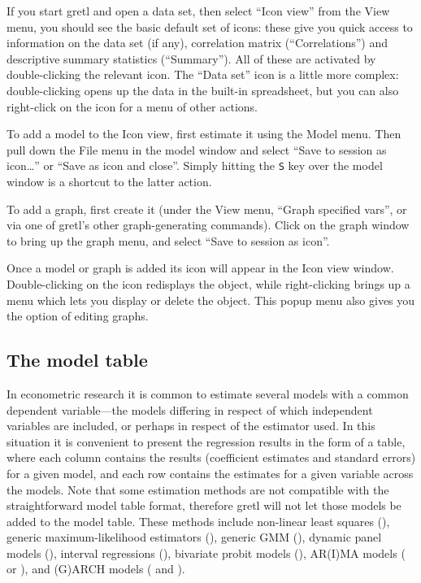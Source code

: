 If you start gretl and open a data set, then select ``Icon
view'' from the View menu, you should see the basic default set of
icons: these give you quick access to information on the data set (if
any), correlation matrix (``Correlations'') and descriptive summary
statistics (``Summary''). All of these are activated by
double-clicking the relevant icon.  The ``Data set'' icon is a little
more complex: double-clicking opens up the data in the built-in
spreadsheet, but you can also right-click on the icon for a menu of
other actions.

To add a model to the Icon view, first estimate it using the Model
menu.  Then pull down the File menu in the model window and select
``Save to session as icon\dots{}'' or ``Save as icon and close''.
Simply hitting the \verb+S+ key over the model window is a shortcut to
the latter action.

To add a graph, first create it (under the View menu, ``Graph
specified vars'', or via one of gretl's other graph-generating
commands).  Click on the graph window to bring up the graph menu, and
select ``Save to session as icon''.

Once a model or graph is added its icon will appear in the Icon view
window.  Double-clicking on the icon redisplays the object, while
right-clicking brings up a menu which lets you display or delete the
object.  This popup menu also gives you the option of editing graphs.

\subsection{The model table}
\label{model-table}

In econometric research it is common to estimate several models with a
common dependent variable---the models differing in respect of which
independent variables are included, or perhaps in respect of the
estimator used.  In this situation it is convenient to present the
regression results in the form of a table, where each column contains
the results (coefficient estimates and standard errors) for a given
model, and each row contains the estimates for a given variable across
the models.  Note that some estimation methods are not compatible with
the straightforward model table format, therefore gretl will not let
those models be added to the model table. These methods include
non-linear least squares (), generic maximum-likelihood
estimators (), generic GMM (), dynamic panel models
(), interval regressions (), bivariate probit
models (), AR(I)MA models ( or ),
and (G)ARCH models ( and ).

